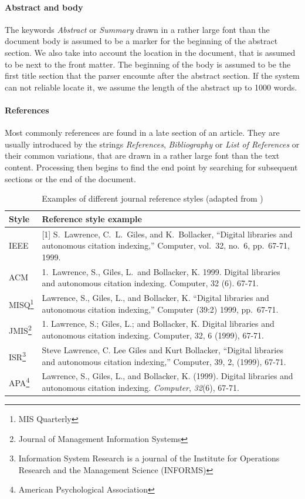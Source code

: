 \paragraph{Abstract and body} The keywords \emph{Abstract} or \emph{Summary} drawn in a rather large font than the document body is assumed to be a marker for the beginning of the abstract section. We also take into account the location in the document, that is assumed to be next to the front matter. The beginning of the body is assumed to be the first title section that the parser encounte after the abstract section. If the system can not reliable locate it, we assume the length of the abstract up to 1000 words.

\paragraph{References} Most commonly references are found in a late section of an article. They are usually introduced by the strings \emph{References}, \emph{Bibliography} or \emph{List of References} or their common variations, that are drawn in a rather large font than the text content. Processing then begins to find the end point by searching for subsequent sections or the end of the document.

\begin{table}
 \centering
 \begin{tabular}{l p{120mm}}
 \toprule
  Style & Reference style example\\
 \midrule
 IEEE & [1] S.\ Lawrence, C.\ L.\ Giles, and K.\ Bollacker, ``Digital libraries and autonomous citation indexing,'' Computer, vol.\ 32, no.\ 6, pp.\ 67-71, 1999.\\
 ACM  & 1.\ Lawrence, S., Giles, L.\ and Bollacker, K. 1999. Digital libraries and autonomous citation indexing. Computer, 32 (6). 67-71.\\
 MISQ\footnote{MIS Quarterly} & Lawrence, S., Giles, L., and Bollacker, K. ``Digital libraries and autonomous citation indexing,'' Computer (39:2) 1999, pp.\ 67-71.\\
 JMIS\footnote{Journal of Management Information Systems} & 1. Lawrence, S.; Giles, L.; and Bollacker, K. Digital libraries and autonomous citation indexing. Computer, 32, 6 (1999), 67-71.\\
 ISR\footnote{Information System Research is a journal of the Institute for Operations Research and the Management Science (INFORMS) }  & Steve Lawrence, C. Lee Giles and Kurt Bollacker, ``Digital libraries and autonomous citation indexing,'' Computer, 39, 2, (1999), 67-71.\\
 APA\footnote{American Psychological Association}  & Lawrence, S., Giles, L., and Bollacker, K. (1999). Digital libraries and autonomous citation indexing. \emph{Computer}, \emph{32}(6), 67-71.\\
 \bottomrule
 \end{tabular}
 \caption{Examples of different journal reference styles (adapted from \cite{day2007})}
 \label{tab:citation_styles}
\end{table}



